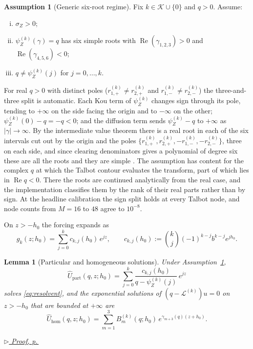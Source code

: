 \documentclass[11pt]{article}
\newcommand{\proofref}[1]{%
  \par\noindent\hfill{\small\itshape\hyperref[#1]{$\triangleright$ Proof, p.\,\pageref{#1}}}}
\newcommand{\Rea}{\operatorname{Re}}
\theoremstyle{plain}
\newtheorem{lemma}[theorem]{Lemma}
\theoremstyle{definition}
\newtheorem{assumption}{Assumption}[section]
\theoremstyle{remark}
\begin{document}
\begin{assumption}[Generic six-root regime]\label{ass:six-root}
Fix $k\in\mathcal K\cup\{0\}$ and $q>0$. Assume:
\begin{enumerate}[(i)]
\item $\sigma_Z>0$;
\item $\psi_Z^{(k)}(\gamma)=q$ has six simple roots with
$\Rea(\gamma_{1,2,3})>0$ and $\Rea(\gamma_{4,5,6})<0$;
\item $q\neq \psi_Z^{(k)}(j)$ for $j=0,\dots,k$.
\end{enumerate}
\end{assumption}

\noindent
For real $q>0$ with distinct poles ($r_{1,+}^{(k)}\neq r_{2,+}^{(k)}$ and $r_{1,-}^{(k)}\neq r_{2,-}^{(k)}$)
the three-and-three split is automatic. Each Kou term of $\psi_Z^{(k)}$ changes sign
through its pole, tending to $+\infty$ on the side facing the origin and to $-\infty$ on the other;
$\psi_Z^{(k)}(0)-q=-q<0$; and the diffusion term sends $\psi_Z^{(k)}-q$ to $+\infty$ as
$|\gamma|\to\infty$. By the intermediate value theorem there is a real root in each of the six
intervals cut out by the origin and the poles $\{r_{1,+}^{(k)},r_{2,+}^{(k)},-r_{1,-}^{(k)},-r_{2,-}^{(k)}\}$,
three on each side, and since clearing denominators gives a polynomial of degree six these are all the
roots and they are simple \citep{KouWang2003,Sepp2004,CaiKou2011}. The assumption has content for the
complex $q$ at which the Talbot contour evaluates the transform, part of which lies in
$\Rea q<0$. There the roots are continued analytically from the real case, and the implementation
classifies them by the rank of their real parts rather than by sign. At the headline calibration the
sign split holds at every Talbot node, and node counts from $M=16$ to $48$ agree to $10^{-8}$.

On $z>-h_0$ the forcing expands as
\begin{equation}\label{eq:forcing-expansion}
g_k(z;h_0) = \sum_{j=0}^k c_{k,j}(h_0)\,e^{jz},
\qquad
c_{k,j}(h_0) := \binom{k}{j}(-1)^{k-j}b^{k-j}e^{jh_0}.
\end{equation}

\begin{lemma}[Particular and homogeneous solutions]\label{lem:Upart}
Under Assumption~\ref{ass:six-root},
\begin{equation}\label{eq:Upart}
\widehat{U}_{\mathrm{part}}(q,z;h_0) = \sum_{j=0}^{k} \frac{c_{k,j}(h_0)}{q - \psi_Z^{(k)}(j)}\,e^{jz}
\end{equation}
solves \eqref{eq:resolvent}, and the exponential solutions of $(q-\mathcal{L}^{(k)})u=0$ on
$z>-h_0$ that are bounded at $+\infty$ are
\begin{equation}\label{eq:Uhom}
\widehat{U}_{\mathrm{hom}}(q,z;h_0) = \sum_{m=1}^{3} B_m^{(k)}(q;h_0)\,e^{\gamma_{m+3}(q)(z+h_0)}.
\end{equation}
\end{lemma}
\proofref{proof:lem:Upart}
\end{document}
